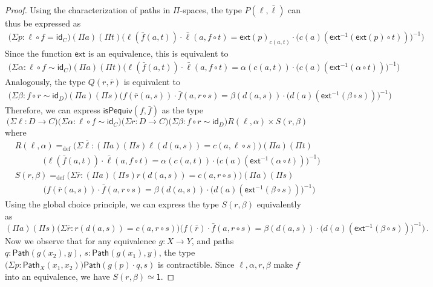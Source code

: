 \documentclass[10pt,a4paper,oneside,reqno]{amsart}
\numberwithin{equation}{section}
\theoremstyle{mythm}
\theoremstyle{mydef}
\theoremstyle{myrmk}
\newcommand{\defeq}{=_{\mathrm{def}}}
\newcommand{\idfun}[1]{\mathsf{id}_{#1}}
\newcommand{\comp}{\circ}
\newcommand{\ext}{\mathsf{ext}}
\newcommand{\ct}{\cdot}
\newcommand{\Id}{\mathsf{Path}}
\newcommand{\one}{\mathsf{1}}
\begin{document}
\begin{proof}
Using the characterization of paths in $\Pi$-spaces, the type $P(\ell,\bar{\ell})$ can thus be expressed as
\begin{align*}
\big(\Sigma p : \ell \comp f = \idfun{C} \big) (\Pi a) (\Pi t) \Big(\ell(\bar{f}(a,t)) \ct \bar{\ell}(a, f \comp t) = \ext(p)_{c(a,t)} \ct \big(c(a)(\ext^{-1}(\ext(p) \circ t))\big)^{-1}\Big)
\end{align*}
Since the function $\ext$ is an equivalence, this is equivalent to
\begin{align*}
\big(\Sigma \alpha : \ell \circ f \sim \idfun{C} \big) (\Pi a) (\Pi t) \Big(\ell(\bar{f}(a,t)) \ct \bar{\ell}(a, f \comp t) = \alpha(c(a,t)) \ct \big(c(a)(\ext^{-1}(\alpha \circ t))\big)^{-1}\Big)
\end{align*}
Analogously, the type $Q(r,\bar{r})$ is equivalent to
\begin{align*}
\big(\Sigma \beta : f \comp r \sim \idfun{D} \big) (\Pi a) (\Pi s) \Big(f(\bar{r}(a,s)) \ct \bar{f}(a, r \comp s) = \beta(d(a,s)) \ct \big(d(a)(\ext^{-1}(\beta \circ s))\big)^{-1}\Big)
\end{align*}
Therefore, we can express $\mathsf{isPequiv}(f,\bar{f})$ as the type
\[ \big(\Sigma \ell : D\to C) \big(\Sigma \alpha : \ell \circ f \sim \idfun{C}\big) \big(\Sigma r : D\to C) \big(\Sigma \beta : f \circ r \sim \idfun{D}\big) R(\ell,\alpha) \times S(r,\beta)\]
where
\begin{align*}
& R(\ell,\alpha) \defeq \big(\Sigma \bar{\ell} : (\Pi a) (\Pi s) \ell(d(a,s))=c(a,\ell \circ s)\big) (\Pi a) (\Pi t) \\ & \;\;\;\;\;\;\;\;\;\;\;\; \Big(\ell(\bar{f}(a,t)) \ct \bar{\ell}(a, f \comp t) = \alpha(c(a,t)) \ct \big(c(a)(\ext^{-1}(\alpha \circ t))\big)^{-1}\Big) \\
& S(r,\beta) \defeq \big(\Sigma \bar{r} : (\Pi a) (\Pi s) r(d(a,s))=c(a,r \circ s) \big) (\Pi a) (\Pi s) \\ & \;\;\;\;\;\;\;\;\;\;\;\; \Big(f(\bar{r}(a,s)) \ct \bar{f}(a, r \comp s) = \beta(d(a,s)) \ct \big(d(a)(\ext^{-1}(\beta \circ s))\big)^{-1}\Big)
\end{align*}
Using the global choice principle, we can express the type $S(r,\beta)$ equivalently as
\[  (\Pi a) (\Pi s) \big(\Sigma \bar{r} : r(d(a,s))=c(a,r \circ s) \big) \Big(f(\bar{r}) \ct \bar{f}(a, r \comp s) = \beta(d(a,s)) \ct \big(d(a)(\ext^{-1}(\beta \circ s))\big)^{-1}\Big) \, .
\]
Now we observe that for any equivalence $g : X \to Y$, and paths $q : \Id(g(x_2),y)$, $s : \Id(g(x_1),y)$, the type $\big(\Sigma p : \Id_X(x_1,x_2)\big) \Id(g(p) \ct q,s)$ is contractible. Since $\ell, \alpha, r, \beta$ make $f$ into an equivalence, we have $S(r,\beta) \simeq \one$.


\end{proof}
\end{document}
